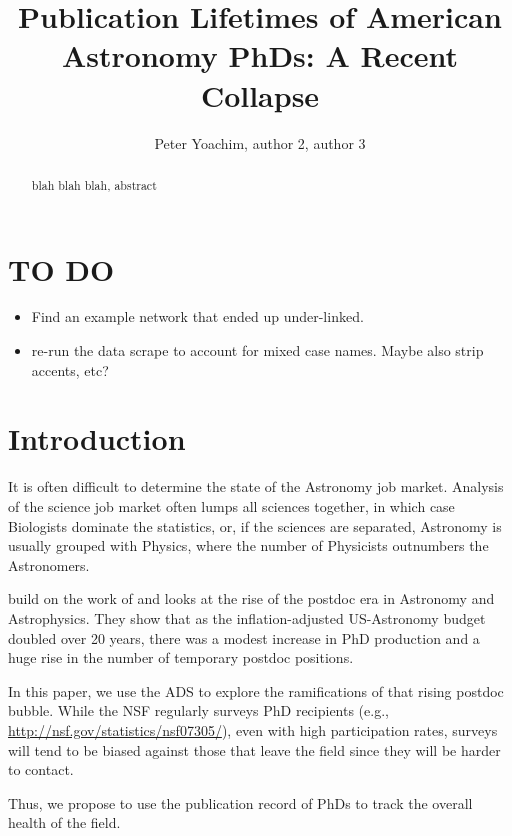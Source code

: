 \documentclass{emulateapj}
\begin{document}
\title{Publication Lifetimes of American Astronomy PhDs: A Recent Collapse}

\author{Peter Yoachim, author 2, author 3 
  }




\begin{abstract}
blah blah blah, abstract

\end{abstract}


\section{TO DO}
\begin{itemize}
\item{Find an example network that ended up under-linked.}
  \item{re-run the data scrape to account for mixed case names. Maybe also strip accents, etc?}
\end{itemize}

\section{Introduction}

It is often difficult to determine the state of the Astronomy job market.  Analysis of the science job market often lumps all sciences together, in which case Biologists dominate the statistics, or, if the sciences are separated, Astronomy is usually grouped with Physics, where the number of Physicists outnumbers the Astronomers.  

\citet{Seth09} build on the work of \citet{Metcalfe08} and looks at the rise of the postdoc era in Astronomy and Astrophysics.  They show that as the inflation-adjusted US-Astronomy budget doubled over 20 years, there was a modest increase in PhD production and a huge rise in the number of temporary postdoc positions.

In this paper, we use the ADS to explore the ramifications of that rising postdoc bubble.  While the NSF regularly surveys PhD recipients (e.g., \url{http://nsf.gov/statistics/nsf07305/}), even with high participation rates, surveys will tend to be biased against those that leave the field since they will be harder to contact.

Thus, we propose to use the publication record of PhDs to track the overall health of the field.  
\end{document}
